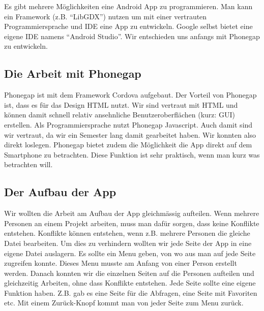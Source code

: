 Es gibt mehrere Möglichkeiten eine Android App zu programmieren. Man kann ein Framework (z.B. "`LibGDX"') nutzen um mit einer vertrauten Programmiersprache und IDE eine App zu entwickeln. Google selbst bietet eine eigene IDE namens "`Android Studio"'. Wir entschieden uns anfangs mit Phonegap zu entwickeln.


\subsection{Die Arbeit mit Phonegap}
Phonegap ist mit dem Framework Cordova aufgebaut. Der Vorteil von Phonegap ist, dass es für das Design HTML nutzt. Wir sind vertraut mit HTML und können damit schnell relativ ansehnliche Benutzeroberflächen (kurz: GUI) erstellen. Als Programmiersprache nutzt Phonegap Javascript. Auch damit sind wir vertraut, da wir ein Semester lang damit gearbeitet haben. Wir konnten also direkt loslegen. Phonegap bietet zudem die Möglichkeit die App direkt auf dem Smartphone zu betrachten. Diese Funktion ist sehr praktisch, wenn man kurz was betrachten will. 

\subsection{Der Aufbau der App}
Wir wollten die Arbeit am Aufbau der App gleichmässig aufteilen. Wenn mehrere Personen an einem Projekt arbeiten, muss man dafür sorgen, dass keine Konflikte entstehen. Konflikte können entstehen, wenn z.B. mehrere Personen die gleiche Datei bearbeiten. Um dies zu verhindern wollten wir jede Seite der App in eine eigene Datei auslagern. Es sollte ein Menu geben, von wo aus man auf jede Seite zugreifen konnte. Dieses Menu musste am Anfang von einer Person erstellt werden. Danach konnten wir die einzelnen Seiten auf die Personen aufteilen und gleichzeitig Arbeiten, ohne dass Konflikte entstehen. Jede Seite sollte eine eigene Funktion haben. Z.B. gab es eine Seite für die Abfragen, eine Seite mit Favoriten etc. Mit einem Zurück-Knopf kommt man von jeder Seite zum Menu zurück.

